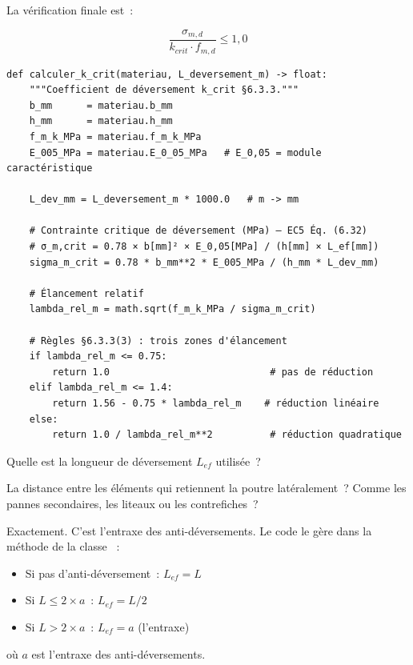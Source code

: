 La v\'erification finale est~:

\begin{equation}
\frac{\sigma_{m,d}}{k_{crit} \cdot f_{m,d}} \leq 1{,}0
\label{eq:taux_dever}
\end{equation}

\begin{lstlisting}[style=python, caption={\fichier{ec5/elu.py} --- coefficient de déversement \py{calculer\_k\_crit()}}]
def calculer_k_crit(materiau, L_deversement_m) -> float:
    """Coefficient de déversement k_crit §6.3.3."""
    b_mm      = materiau.b_mm
    h_mm      = materiau.h_mm
    f_m_k_MPa = materiau.f_m_k_MPa
    E_005_MPa = materiau.E_0_05_MPa   # E_0,05 = module caractéristique

    L_dev_mm = L_deversement_m * 1000.0   # m -> mm

    # Contrainte critique de déversement (MPa) — EC5 Éq. (6.32)
    # σ_m,crit = 0.78 × b[mm]² × E_0,05[MPa] / (h[mm] × L_ef[mm])
    sigma_m_crit = 0.78 * b_mm**2 * E_005_MPa / (h_mm * L_dev_mm)

    # Élancement relatif
    lambda_rel_m = math.sqrt(f_m_k_MPa / sigma_m_crit)

    # Règles §6.3.3(3) : trois zones d'élancement
    if lambda_rel_m <= 0.75:
        return 1.0                            # pas de réduction
    elif lambda_rel_m <= 1.4:
        return 1.56 - 0.75 * lambda_rel_m    # réduction linéaire
    else:
        return 1.0 / lambda_rel_m**2          # réduction quadratique
\end{lstlisting}

\begin{maitre}
Quelle est la longueur de d\'eversement $L_{ef}$ utilis\'ee~?
\end{maitre}

\begin{apprenti}
La distance entre les \'el\'ements qui retiennent la poutre lat\'eralement~?
Comme les pannes secondaires, les liteaux ou les contrefiches~?
\end{apprenti}

\begin{maitre}
Exactement. C'est l'entraxe des anti-d\'eversements. Le code le g\`ere
dans la m\'ethode  de la classe ~:
\begin{itemize}
  \item Si pas d'anti-d\'eversement~: $L_{ef} = L$
  \item Si $L \leq 2 \times a$~: $L_{ef} = L/2$
  \item Si $L > 2 \times a$~: $L_{ef} = a$ (l'entraxe)
\end{itemize}
o\`u $a$ est l'entraxe des anti-d\'eversements.
\end{maitre}